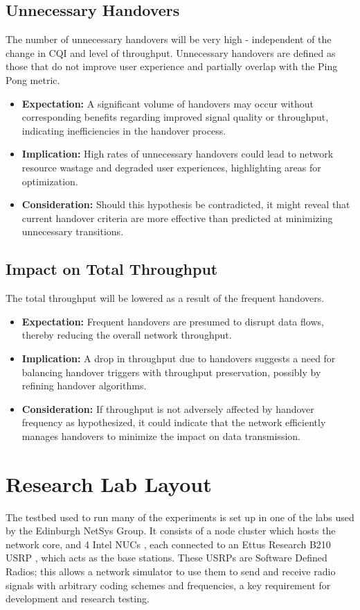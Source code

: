 \subsection{Unnecessary Handovers}
The number of unnecessary handovers will be very high - independent of the change in CQI and level of throughput. Unnecessary handovers are defined as those that do not improve user experience and partially overlap with the Ping Pong metric.
\begin{itemize}
    \item \textbf{Expectation:} A significant volume of handovers may occur without corresponding benefits regarding improved signal quality or throughput, indicating inefficiencies in the handover process.
    \item \textbf{Implication:} High rates of unnecessary handovers could lead to network resource wastage and degraded user experiences, highlighting areas for optimization.
    \item \textbf{Consideration:} Should this hypothesis be contradicted, it might reveal that current handover criteria are more effective than predicted at minimizing unnecessary transitions.
\end{itemize}

\subsection{Impact on Total Throughput}
The total throughput will be lowered as a result of the frequent handovers.
\begin{itemize}
    \item \textbf{Expectation:} Frequent handovers are presumed to disrupt data flows, thereby reducing the overall network throughput.
    \item \textbf{Implication:} A drop in throughput due to handovers suggests a need for balancing handover triggers with throughput preservation, possibly by refining handover algorithms.
    \item \textbf{Consideration:} If throughput is not adversely affected by handover frequency as hypothesized, it could indicate that the network efficiently manages handovers to minimize the impact on data transmission.
\end{itemize}


\section{Research Lab Layout} \label{sec:research-lab-layout}
The testbed used to run many of the experiments is set up in one of the labs used by the Edinburgh NetSys Group. It consists of a node cluster which hosts the network core, and 4 Intel NUCs \insertref, each connected to an Ettus Research B210 USRP \insertref, which acts as the base stations. These USRPs are Software Defined Radios; this allows a network simulator to use them to send and receive radio signals with arbitrary coding schemes and frequencies, a key requirement for development and research testing.

